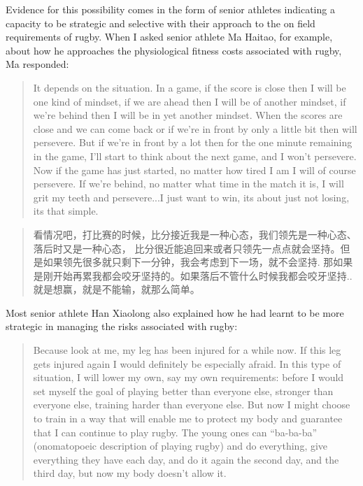 \begin{CJK}{UTF8}{gbsn}
Evidence for this possibility comes in the form of senior athletes indicating a capacity to be strategic and selective with their approach to the on field requirements of rugby.  When I asked senior athlete Ma Haitao, for example, about how he approaches the physiological fitness costs associated with rugby, Ma responded:

    \begin{quotation}
      It depends on the situation.  In a game, if the score is close then I will be one kind of mindset, if we are ahead then I will be of another mindset, if we're behind then I will be in yet another mindset.  When the scores are close and we can come back or if we're in front by only a little bit then will persevere.  But if we're in front by a lot then for the one minute remaining in the game, I'll start to think about the next game, and I won't persevere.  Now if the game has just started, no matter how tired I am I will of course persevere. If we're behind, no matter what time in the match it is, I will grit my teeth and persevere...I just want to win, its about just not losing, its that simple.
    \end{quotation}

    \begin{quotation}
      看情况吧，打比赛的时候，比分接近我是一种心态，我们领先是一种心态、落后时又是一种心态， 比分很近能追回来或者只领先一点点就会坚持。但是如果领先很多就只剩下一分钟，我会考虑到下一场，就不会坚持.  那如果是刚开始再累我都会咬牙坚持的。如果落后不管什么时候我都会咬牙坚持..就是想赢，就是不能输，就那么简单。
    \end{quotation}

Most senior athlete Han Xiaolong also explained how he had learnt to be more strategic in managing the risks associated with rugby:

    \begin{quotation}
      Because look at me, my leg has been injured for a while now.  If this leg gets injured again I would definitely be especially afraid.  In this type of situation, I will lower my own, say my own requirements: before I would set myself the goal of playing better than everyone else, stronger than everyone else, training harder than everyone else.  But now I might choose to train in a way that will enable me to protect my body and guarantee that I can continue to play rugby.  The young ones can ``ba-ba-ba'' (onomatopoeic description of playing rugby) and do everything, give everything they have each day, and do it again the second day, and the third day, but now my body doesn't allow it.
    \end{quotation}


\end{CJK}
